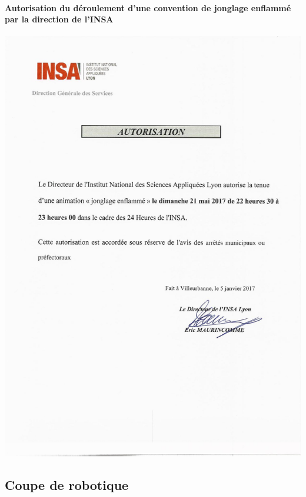 \documentclass[hidelinks, paper=a4, fontsize=13pt]{report}
\begin{document}
\newpage

\paragraph{Autorisation du déroulement d’une convention de jonglage enflammé par la direction de l’INSA}
\begin{center}
\includegraphics[width=.8\textwidth,keepaspectratio]{Annexes/Documents/INSAAutorisationSpectacleDeFeu}
\end{center}


\subsection{Coupe de robotique}
\end{document}
